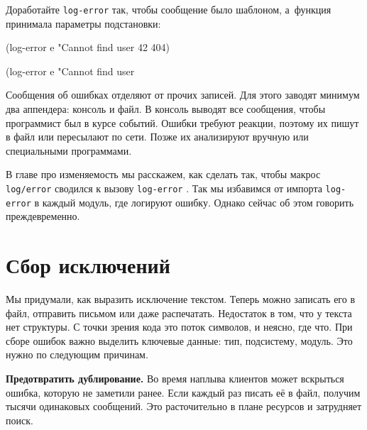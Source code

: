 \fi

Доработайте \verb|log-error| так, чтобы сообщение было шаблоном, а~функция
принимала параметры подстановки:

\ifx\DEVICETYPE\MOBILE

\begin{english}
  \begin{clojure}
(log-error e
  "Cannot find user %
  42 404)
  \end{clojure}
\end{english}

\else

\begin{english}
  \begin{clojure}
(log-error e "Cannot find user %
  \end{clojure}
\end{english}

\fi

Сообщения об ошибках отделяют от прочих записей. Для этого заводят минимум два
аппендера: консоль и файл. В консоль выводят все сообщения, чтобы программист
был в курсе событий. Ошибки требуют реакции, поэтому их пишут в файл или
пересылают по сети. Позже их анализируют вручную или специальными программами.

В главе про изменяемость мы расскажем, как сделать так, чтобы макрос
\verb|log/error| сводился к вызову \verb|log-error| .
Так мы избавимся от импорта \verb|log-error| в каждый модуль, где логируют ошибку.
Однако сейчас об этом говорить преждевременно.

\section{Сбор исключений}


Мы придумали, как выразить исключение текстом. Теперь можно записать его в файл,
отправить письмом или даже распечатать. Недостаток в том, что у текста нет
структуры. С точки зрения кода это поток символов, и неясно, где что. При сборе
ошибок важно выделить ключевые данные: тип, подсистему, модуль. Это нужно по
следующим причинам.

\textbf{Предотвратить дублирование.} Во время наплыва клиентов может вскрыться
ошибка, которую не заметили ранее. Если каждый раз писать её в файл, получим
тысячи одинаковых сообщений. Это расточительно в плане ресурсов и затрудняет
поиск.


